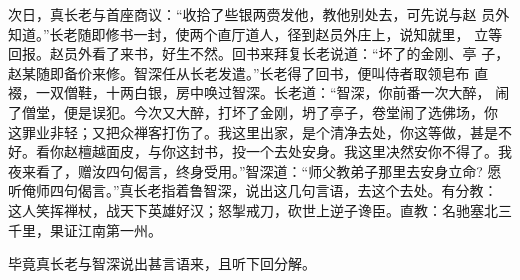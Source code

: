 次日，真长老与首座商议：“收拾了些银两赍发他，教他别处去，可先说与赵
员外知道。”长老随即修书一封，使两个直厅道人，径到赵员外庄上，说知就里，
立等回报。赵员外看了来书，好生不然。回书来拜复长老说道：“坏了的金刚、亭
子，赵某随即备价来修。智深任从长老发遣。”长老得了回书，便叫侍者取领皂布
直裰，一双僧鞋，十两白银，房中唤过智深。长老道：“智深，你前番一次大醉，
闹了僧堂，便是误犯。今次又大醉，打坏了金刚，坍了亭子，卷堂闹了选佛场，你
这罪业非轻；又把众禅客打伤了。我这里出家，是个清净去处，你这等做，甚是不
好。看你赵檀越面皮，与你这封书，投一个去处安身。我这里决然安你不得了。我
夜来看了，赠汝四句偈言，终身受用。”智深道：“师父教弟子那里去安身立命?
愿听俺师四句偈言。”真长老指着鲁智深，说出这几句言语，去这个去处。有分教：
这人笑挥禅杖，战天下英雄好汉；怒掣戒刀，砍世上逆子谗臣。直教：名驰塞北三
千里，果证江南第一州。

毕竟真长老与智深说出甚言语来，且听下回分解。